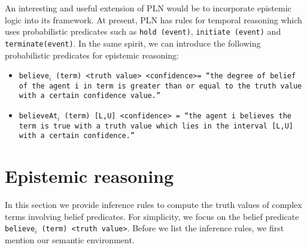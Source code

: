 \documentclass[12pt]{article}
\begin{document}
An interesting and useful extension of PLN would be to incorporate epistemic logic into its framework. At present, PLN has rules for temporal reasoning which uses probabilistic predicates such as \texttt{hold (event)}, \texttt{initiate (event)} and \texttt{terminate(event)}. In the same spirit, we can introduce the following probabilistic predicates for epistemic reasoning:

\begin{itemize}
\item
\texttt{believe$_i$ (term) <truth value> <confidence>= ``the degree of belief of the agent $i$ in term is greater than or equal to the truth value with a certain confidence value.''}
\item

\texttt{believeAt$_i$ (term) [L,U] <confidence> = ``the agent $i$ believes the term is true with a truth value which lies in the interval [L,U] with a certain confidence.''} 




\end{itemize}
 
\section{Epistemic reasoning} 

In this section we provide inference rules to compute the truth values of complex terms involving belief predicates. For simplicity, we focus on the belief predicate \texttt{believe$_i$ (term) <truth value>}. Before we list the inference rules, we first mention our semantic environment. 
\end{document}

